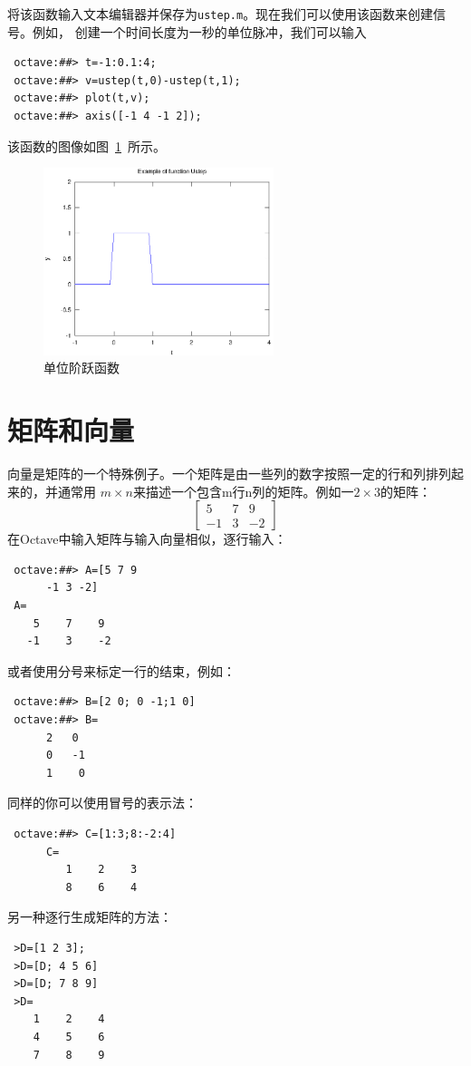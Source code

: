 \documentclass[UTF8,adobefonts]{ctexart}
\begin{document}
将该函数输入文本编辑器并保存为{\tt ustep.m}。现在我们可以使用该函数来创建信号。例如，
创建一个时间长度为一秒的单位脉冲，我们可以输入
\begin{verbatim}
 octave:##> t=-1:0.1:4;
 octave:##> v=ustep(t,0)-ustep(t,1);
 octave:##> plot(t,v);
 octave:##> axis([-1 4 -1 2]);
\end{verbatim}
该函数的图像如图~\ref{Ustep}~所示。
\begin{figure}
 \centering
 \includegraphics[width=0.6\textwidth]{Ustep.eps}
  \caption{单位阶跃函数}
 \label{Ustep}
\end{figure}

\section{矩阵和向量}
向量是矩阵的一个特殊例子。一个矩阵是由一些列的数字按照一定的行和列排列起来的，并通常用
$m \times n$来描述一个包含m行n列的矩阵。例如一$2\times3$的矩阵：
\[
\left[\begin{matrix}
 5 & 7 & 9  \\
 -1 & 3 & -2 
\end{matrix}\right]
\]
在Octave中输入矩阵与输入向量相似，逐行输入：
\begin{verbatim}
 octave:##> A=[5 7 9
      -1 3 -2]
 A=
    5    7    9
   -1    3    -2
\end{verbatim}
或者使用分号来标定一行的结束，例如：
\begin{verbatim}
 octave:##> B=[2 0; 0 -1;1 0]
 octave:##> B=
      2   0
      0   -1
      1    0
\end{verbatim}
同样的你可以使用冒号的表示法：
\begin{verbatim}
 octave:##> C=[1:3;8:-2:4]
      C=
         1    2    3
         8    6    4
\end{verbatim}
另一种逐行生成矩阵的方法：
\begin{verbatim}
 >D=[1 2 3];
 >D=[D; 4 5 6]
 >D=[D; 7 8 9]
 >D=
    1    2    4
    4    5    6
    7    8    9
\end{verbatim}
\end{document}
